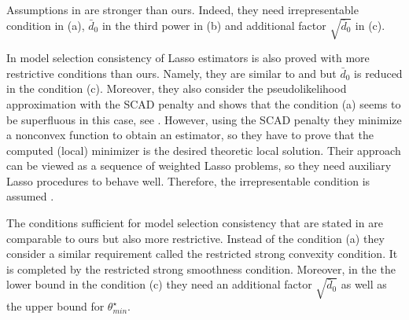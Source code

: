 \documentclass[twoside,11pt]{article}
\def\th{\theta}
\def\ths{\th^\star}
\def\bd0{\bar{d} _0}
\begin{document}
Assumptions in  \citet[Theorem 2]{Guoetal10} are stronger than ours. Indeed, they need irrepresentable condition in (a), $\bd0$ in the third power in (b) and additional factor $\sqrt{\bd0}$ in (c).


In \citet[Corollary 3.1 (2)]{Xueetal12} model selection consistency of Lasso estimators is also proved with more restrictive conditions than ours. Namely, they are similar to \citet{Ravi10} and 
\citet{Guoetal10} but $\bd0$ is reduced in the condition (c).
Moreover, they also consider the pseudolikelihood approximation with the SCAD penalty 
and shows that the condition (a) seems to be superfluous in this case, see \citet[Corollary 3.1 (1)]{Xueetal12}. However, using the SCAD penalty they minimize a nonconvex function to obtain an estimator, so 
they have to prove that the computed (local) minimizer is the desired theoretic local solution. Their approach can be viewed as a sequence of weighted Lasso problems, so they need auxiliary Lasso procedures to behave well. Therefore, the irrepresentable condition is assumed \citep[Corollary 3.2]{Xueetal12}.  

The conditions sufficient for model selection consistency that are stated in \citet[Theorem 2]{Jalali11} are comparable to ours but also more restrictive. Instead of the condition (a) they consider a similar requirement called the restricted strong convexity condition. It is completed by the  restricted strong smoothness condition. Moreover, in the the lower bound in the condition (c) they need an additional factor $\sqrt{\bd0}$ as well as the upper bound for $\ths _{min}.$


 
\end{document}
